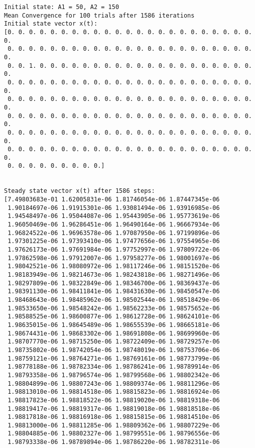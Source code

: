 \documentclass[11pt]{article}
\begin{document}
\begin{Verbatim}[commandchars=\\\{\}]
Initial state: A1 = 50, A2 = 150
Mean Convergence for 100 trials after 1586 iterations
Initial state vector x(t):
[0. 0. 0. 0. 0. 0. 0. 0. 0. 0. 0. 0. 0. 0. 0. 0. 0. 0. 0. 0. 0. 0. 0. 0.
 0. 0. 0. 0. 0. 0. 0. 0. 0. 0. 0. 0. 0. 0. 0. 0. 0. 0. 0. 0. 0. 0. 0. 0.
 0. 0. 1. 0. 0. 0. 0. 0. 0. 0. 0. 0. 0. 0. 0. 0. 0. 0. 0. 0. 0. 0. 0. 0.
 0. 0. 0. 0. 0. 0. 0. 0. 0. 0. 0. 0. 0. 0. 0. 0. 0. 0. 0. 0. 0. 0. 0. 0.
 0. 0. 0. 0. 0. 0. 0. 0. 0. 0. 0. 0. 0. 0. 0. 0. 0. 0. 0. 0. 0. 0. 0. 0.
 0. 0. 0. 0. 0. 0. 0. 0. 0. 0. 0. 0. 0. 0. 0. 0. 0. 0. 0. 0. 0. 0. 0. 0.
 0. 0. 0. 0. 0. 0. 0. 0. 0. 0. 0. 0. 0. 0. 0. 0. 0. 0. 0. 0. 0. 0. 0. 0.
 0. 0. 0. 0. 0. 0. 0. 0. 0. 0. 0. 0. 0. 0. 0. 0. 0. 0. 0. 0. 0. 0. 0. 0.
 0. 0. 0. 0. 0. 0. 0. 0. 0.]


Steady state vector x(t) after 1586 steps:
[7.49803683e-01 1.62005831e-06 1.81746054e-06 1.87447345e-06
 1.90184697e-06 1.91915301e-06 1.93081494e-06 1.93916985e-06
 1.94548497e-06 1.95044087e-06 1.95443905e-06 1.95773619e-06
 1.96050469e-06 1.96286451e-06 1.96490164e-06 1.96667934e-06
 1.96824522e-06 1.96963578e-06 1.97087950e-06 1.97199896e-06
 1.97301225e-06 1.97393410e-06 1.97477656e-06 1.97554965e-06
 1.97626173e-06 1.97691984e-06 1.97752997e-06 1.97809722e-06
 1.97862598e-06 1.97912007e-06 1.97958277e-06 1.98001697e-06
 1.98042521e-06 1.98080972e-06 1.98117246e-06 1.98151520e-06
 1.98183949e-06 1.98214673e-06 1.98243818e-06 1.98271496e-06
 1.98297809e-06 1.98322849e-06 1.98346700e-06 1.98369437e-06
 1.98391130e-06 1.98411841e-06 1.98431630e-06 1.98450547e-06
 1.98468643e-06 1.98485962e-06 1.98502544e-06 1.98518429e-06
 1.98533650e-06 1.98548242e-06 1.98562233e-06 1.98575652e-06
 1.98588525e-06 1.98600877e-06 1.98612728e-06 1.98624101e-06
 1.98635015e-06 1.98645489e-06 1.98655539e-06 1.98665181e-06
 1.98674431e-06 1.98683302e-06 1.98691808e-06 1.98699960e-06
 1.98707770e-06 1.98715250e-06 1.98722409e-06 1.98729257e-06
 1.98735802e-06 1.98742054e-06 1.98748019e-06 1.98753706e-06
 1.98759121e-06 1.98764271e-06 1.98769161e-06 1.98773799e-06
 1.98778188e-06 1.98782334e-06 1.98786241e-06 1.98789914e-06
 1.98793358e-06 1.98796574e-06 1.98799568e-06 1.98802342e-06
 1.98804899e-06 1.98807243e-06 1.98809374e-06 1.98811296e-06
 1.98813010e-06 1.98814518e-06 1.98815823e-06 1.98816924e-06
 1.98817823e-06 1.98818522e-06 1.98819020e-06 1.98819318e-06
 1.98819417e-06 1.98819317e-06 1.98819018e-06 1.98818518e-06
 1.98817818e-06 1.98816918e-06 1.98815815e-06 1.98814510e-06
 1.98813000e-06 1.98811285e-06 1.98809362e-06 1.98807229e-06
 1.98804885e-06 1.98802327e-06 1.98799551e-06 1.98796556e-06
 1.98793338e-06 1.98789894e-06 1.98786220e-06 1.98782311e-06

\end{Verbatim}
\end{document}
